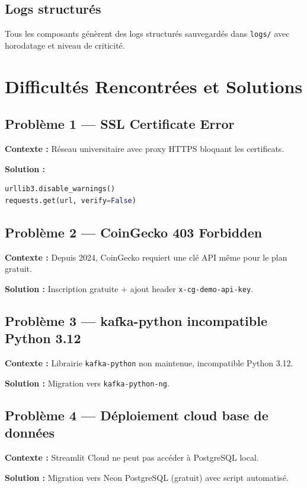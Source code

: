 \documentclass[12pt,a4paper]{article}
\begin{document}
\subsection{Logs structurés}
Tous les composants génèrent des logs structurés sauvegardés dans \texttt{logs/} avec horodatage et niveau de criticité.

\section{Difficultés Rencontrées et Solutions}

\subsection{Problème 1 — SSL Certificate Error}
\textbf{Contexte :} Réseau universitaire avec proxy HTTPS bloquant les certificats.

\textbf{Solution :}
\begin{lstlisting}[language=Python]
urllib3.disable_warnings()
requests.get(url, verify=False)
\end{lstlisting}

\subsection{Problème 2 — CoinGecko 403 Forbidden}
\textbf{Contexte :} Depuis 2024, CoinGecko requiert une clé API même pour le plan gratuit.

\textbf{Solution :} Inscription gratuite + ajout header \texttt{x-cg-demo-api-key}.

\subsection{Problème 3 — kafka-python incompatible Python 3.12}
\textbf{Contexte :} Librairie \texttt{kafka-python} non maintenue, incompatible Python 3.12.

\textbf{Solution :} Migration vers \texttt{kafka-python-ng}.

\subsection{Problème 4 — Déploiement cloud base de données}
\textbf{Contexte :} Streamlit Cloud ne peut pas accéder à PostgreSQL local.

\textbf{Solution :} Migration vers Neon PostgreSQL (gratuit) avec script automatisé.
\end{document}
